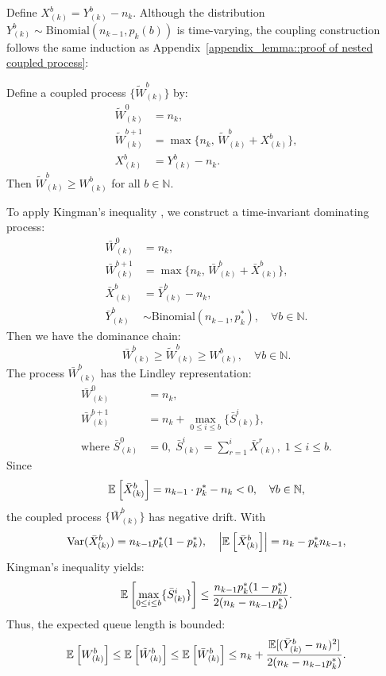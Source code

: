 Define $X_{(k)}^b = Y_{(k)}^b - n_k$. Although the distribution $Y_{(k)}^b\sim \text{Binomial}(n_{k-1},p_k(b))$ is time-varying, the coupling construction follows the same induction as Appendix~\ref{appendix_lemma::proof of nested coupled process}:
\begin{lemma}\label{lemma: coupling, time varying}
Define a coupled process $\{ \tilde{W}_{(k)}^b\}$ by:
\begin{equation*}
\begin{aligned}
\tilde{W}_{(k)}^0 &= n_k, \\
\tilde{W}_{(k)}^{b+1} &= \max\{ n_k, \, \tilde{W}_{(k)}^b+X_{(k)}^b\}, \\
X_{(k)}^b &= Y_{(k)}^b - n_k.
\end{aligned}
\end{equation*}
Then $\tilde{W}^b_{(k)}\geq W^b_{(k)}$ for all $b\in \mathbb{N}$.
\end{lemma}
To apply Kingman's inequality \citep{kingman1962queues}, we construct a time-invariant dominating process:
\begin{equation*}
\begin{aligned}
\bar{W}_{(k)}^0 &= n_k, \\
\bar{W}_{(k)}^{b+1} &= \max\{ n_k,\, \bar{W}_{(k)}^{b}+\bar{X}_{(k)}^b \}, \\
\bar{X}_{(k)}^b &= \bar{Y}_{(k)}^b  -n_k, \\
\bar{Y}_{(k)}^b &\sim \text{Binomial}(n_{k-1}, p_k^*), \quad \forall b\in \mathbb{N}.
\end{aligned}
\end{equation*}
Then we have the dominance chain:
$$\bar{W}^b_{(k)}\geq \tilde{W}^b_{(k)}\geq W^b_{(k)},\quad \forall b\in \mathbb{N}.$$
The process $\bar{W}^b_{(k)}$ has the Lindley representation:
\begin{equation*}
\begin{aligned}
\bar{W}_{(k)}^0 &= n_k, \\
\bar{W}_{(k)}^{b+1} &= n_k + \max_{0\leq i\leq b}\{ \bar{S}_{(k)}^i \}, \\
\text{where } \bar{S}_{(k)}^0 &= 0,\; \bar{S}_{(k)}^i = \sum_{r=1}^i \bar{X}_{(k)}^{r},\; 1\leq i\leq b.
\end{aligned}
\end{equation*}
Since
$$ \mathbb{E}_{}\left[\bar{X}_{(k)}^b\right] = n_{k-1}\cdot p_{k}^* - n_k <0,\quad \forall b\in \mathbb{N}, $$
the coupled process $\{\bar{W}_{(k)}^b \}$ has negative drift. With
$$\text{Var}(\bar{X}_{(k)}^b) = n_{k-1}p_k^*(1-p_k^*),\quad \left|\mathbb{E}_{}\left[\bar{X}_{(k)}^b\right]\right|=n_k - p_k^* n_{k-1},$$
Kingman's inequality \citep{kingman1962queues} yields:
$$\mathbb{E}_{}\left[\max_{0\leq i\leq b}\{ \bar{S}_{(k)}^i \}  \right]\leq  \frac{  n_{k-1}p_k^*(1-p_k^*) }{ 2(n_k - n_{k-1}p_k^*)}. $$
Thus, the expected queue length is bounded:
$$\mathbb{E}_{}\left[W_{(k)}^b\right]\leq \mathbb{E}_{}\left[\tilde{W}_{(k)}^b\right]\leq \mathbb{E}_{}\left[\bar{W}_{(k)}^b\right] \leq n_k + \frac{\mathbb{E}[(\bar{Y}_{(k)}^b-n_k)^2]}{2(n_k - n_{k-1}p_k^*)}.$$
